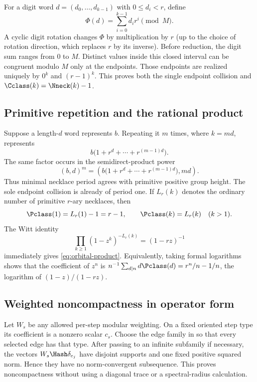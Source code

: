 For a digit word $d=(d_0,\ldots,d_{k-1})$ with $0\le d_i<r$, define
\[
 \Phi(d)=\sum_{i=0}^{k-1}d_i r^i\pmod M.
\]
A cyclic digit rotation changes $\Phi$ by multiplication by $r$ (up to the
choice of rotation direction, which replaces $r$ by its inverse).  Before
reduction, the digit sum ranges from $0$ to $M$.  Distinct values inside this
closed interval can be congruent modulo $M$ only at the endpoints.  Those
endpoints are realized uniquely by $0^k$ and $(r-1)^k$.  This proves both the
single endpoint collision and $\Cclass(k)=\Nneck(k)-1$.

\subsection{Primitive repetition and the rational product}

Suppose a length-$d$ word represents $b$.  Repeating it $m$ times, where
$k=md$, represents
\begin{equation}
 b\bigl(1+r^d+\cdots+r^{(m-1)d}\bigr).
 \label{eq:digit-repeat}
\end{equation}
The same factor occurs in the semidirect-product power
\[
 (b,d)^m=
 \left(b\bigl(1+r^d+\cdots+r^{(m-1)d}\bigr),md\right).
\]
Thus minimal necklace period agrees with primitive positive group height.
The sole endpoint collision is already of period one.  If $L_r(k)$ denotes
the ordinary number of primitive $r$-ary necklaces, then
\[
 \Pclass(1)=L_r(1)-1=r-1,
 \qquad \Pclass(k)=L_r(k)\quad(k>1).
\]
The Witt identity
\[
 \prod_{k\ge1}(1-z^k)^{-L_r(k)}=(1-rz)^{-1}
\]
immediately gives \eqref{eq:orbital-product}.  Equivalently, taking formal
logarithms shows that the coefficient of $z^n$ is
$n^{-1}\sum_{d\mid n}d\Pclass(d)=r^n/n-1/n$, the logarithm of
$(1-z)/(1-rz)$.

\subsection{Weighted noncompactness in operator form}

Let $W_s$ be any allowed per-step modular weighting.  On a fixed oriented
step type its coefficient is a nonzero scalar $c_s$.  Choose the edge family
in  so that every selected edge has that type.  After
passing to an infinite subfamily if necessary, the vectors
$W_s\Hash\delta_{e_j}$ have disjoint supports and one fixed positive squared
norm.  Hence they have no norm-convergent subsequence.  This proves
noncompactness without using a diagonal trace or a spectral-radius
calculation.

